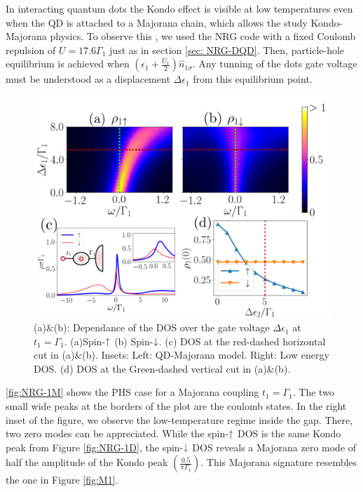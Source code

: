 In interacting quantum dots the Kondo effect is visible at low temperatures even when the QD is attached to a Majorana chain, which allows the study Kondo-Majorana physics. To observe this , we used the NRG code with a fixed Coulomb repulsion of $U = 17.6\Gamma_1$ just as in section \ref{sec: NRG-DQD}. Then, particle-hole equilibrium is achieved when $\left(\epsilon_{1}+\frac{U_1}{2}\right)\hat{n}_{1\sigma}$. Any tunning of the dots gate voltage must be understood as a displacement $\Delta \epsilon_1$ from this equilibrium point. 




 \begin{figure}[h]
 \centering
   \includegraphics[scale=0.6]{IMAGES/Majorana/NRG-FullED.png}
   \caption{ \label{fig:QD-ed}(a)\&(b): Dependance of the DOS over the gate voltage $\Delta \epsilon_1$ at $t_1 = \Gamma_1$. (a)Spin-$\uparrow$ (b) Spin-$\downarrow$. (c) DOS at the red-dashed horizontal cut in (a)\&(b). Insets: Left: QD-Majorana model. Right: Low energy DOS. (d) DOS at the Green-dashed vertical cut in (a)\&(b). \protect{} }
   \end{figure}



 \ref{fig:NRG-1M} shows the PHS case for a Majorana coupling $t_1=\Gamma_1$. The two small wide peaks at the borders of the plot are the coulomb states. In the right inset of the figure, we observe the low-temperature regime inside the gap. There, two zero modes can be appreciated.  While the spin-$\uparrow$ DOS is the same Kondo peak from Figure \ref{fig:NRG-1D}, the spin-$\downarrow$ DOS reveals a Majorana zero mode of half the amplitude of the Kondo peak $\left(\frac{0.5}{\pi\Gamma_1}\right)$.  This  Majorana signature resembles the one in Figure \ref{fig:M1}.


